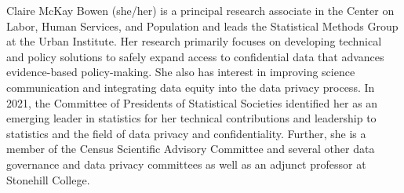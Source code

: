 
Claire McKay Bowen (she/her) is a principal research associate in the Center on Labor, Human Services, and Population and leads the Statistical Methods Group at the Urban Institute. Her research primarily focuses on developing technical and policy solutions to safely expand access to confidential data that advances evidence-based policy-making. She also has interest in improving science communication and integrating data equity into the data privacy process. In 2021, the Committee of Presidents of Statistical Societies identified her as an emerging leader in statistics for her technical contributions and leadership to statistics and the field of data privacy and confidentiality. Further, she is a member of the Census Scientific Advisory Committee and several other data governance and data privacy committees as well as an adjunct professor at Stonehill College.